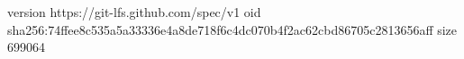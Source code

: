 version https://git-lfs.github.com/spec/v1
oid sha256:74ffee8c535a5a33336e4a8de718f6c4dc070b4f2ac62cbd86705c2813656aff
size 699064
